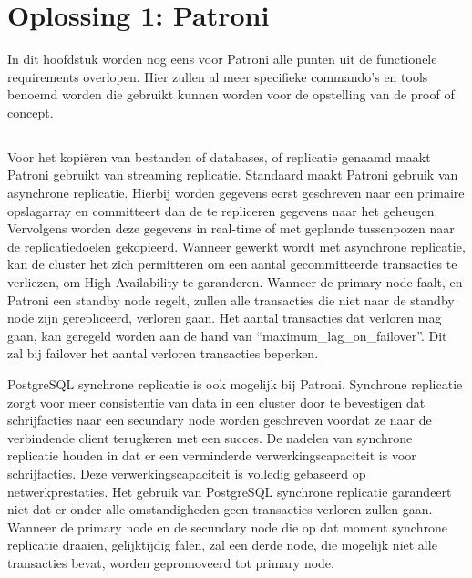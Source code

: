 
\chapter{Oplossing 1: Patroni}
\label{ch:Oplossing 1: Patroni}

In dit hoofdstuk worden nog eens voor Patroni alle punten uit de functionele requirements overlopen. Hier zullen al meer specifieke commando's en tools benoemd worden die gebruikt kunnen worden voor de opstelling van de proof of concept.

\section{}
\label{sec:Redundantie/Replicatie}

Voor het kopiëren van bestanden of databases, of replicatie genaamd maakt Patroni gebruikt van streaming replicatie. Standaard maakt Patroni gebruik van asynchrone replicatie. Hierbij worden gegevens eerst geschreven naar een primaire opslagarray en committeert dan de te repliceren gegevens naar het geheugen. Vervolgens worden deze gegevens in real-time of met geplande tussenpozen naar de replicatiedoelen gekopieerd.
Wanneer gewerkt wordt met asynchrone replicatie, kan de cluster het zich permitteren om een aantal gecommitteerde transacties te verliezen, om High Availability te garanderen. Wanneer de primary node faalt, en Patroni een standby node regelt, zullen alle transacties die niet naar de standby node zijn gerepliceerd, verloren gaan. Het aantal transacties dat verloren mag gaan, kan geregeld worden aan de hand van “maximum\_lag\_on\_failover”. Dit zal bij failover het aantal verloren transacties beperken.

PostgreSQL synchrone replicatie is ook mogelijk bij Patroni. Synchrone replicatie zorgt voor meer consistentie van data in een cluster door te bevestigen dat schrijfacties naar een secundary node worden geschreven voordat ze naar de verbindende client terugkeren met een succes. De nadelen van synchrone replicatie houden in dat er een verminderde verwerkingscapaciteit is voor schrijfacties. Deze verwerkingscapaciteit is volledig gebaseerd op netwerkprestaties. Het gebruik van PostgreSQL synchrone replicatie garandeert niet dat er onder alle omstandigheden geen transacties verloren zullen gaan. Wanneer de primary node en de secundary node die op dat moment synchrone replicatie draaien, gelijktijdig falen, zal een derde node, die mogelijk niet alle transacties bevat, worden gepromoveerd tot primary node.

